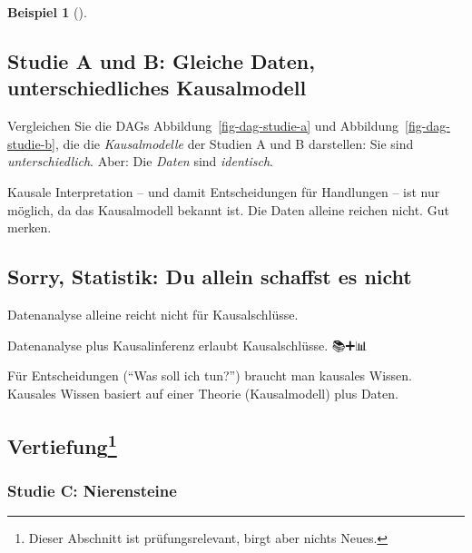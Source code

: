 \documentclass[
  ngerman,
  letterpaper,
  twoside,
  open=any]{scrbook}
\theoremstyle{definition}
\newtheorem{example}{Beispiel}[chapter]
\theoremstyle{plain}
\theoremstyle{definition}
\theoremstyle{definition}
\theoremstyle{remark}
\begin{document}
\begin{example}[]
\subsection{Studie A und B: Gleiche Daten, unterschiedliches
Kausalmodell}\label{studie-a-und-b-gleiche-daten-unterschiedliches-kausalmodell-1}

Vergleichen Sie die DAGs Abbildung~\ref{fig-dag-studie-a} und
Abbildung~\ref{fig-dag-studie-b}, die die \emph{Kausalmodelle} der
Studien A und B darstellen: Sie sind \emph{unterschiedlich}. Aber: Die
\emph{Daten} sind \emph{identisch}.

Kausale Interpretation -- und damit Entscheidungen für Handlungen -- ist
nur möglich, da das Kausalmodell bekannt ist. Die Daten alleine reichen
nicht. Gut merken.

\subsection{Sorry, Statistik: Du allein schaffst es
nicht}\label{sorry-statistik-du-allein-schaffst-es-nicht-1}

Datenanalyse alleine reicht nicht für Kausalschlüsse. 🧟

Datenanalyse plus Kausalinferenz erlaubt Kausalschlüsse. 📚➕📊 🟰 🤩

\begin{tcolorbox}[enhanced jigsaw, arc=.35mm, bottomrule=.15mm, bottomtitle=1mm, breakable, colback=white, colbacktitle=quarto-callout-important-color!10!white, colframe=quarto-callout-important-color-frame, coltitle=black, left=2mm, leftrule=.75mm, opacityback=0, opacitybacktitle=0.6, rightrule=.15mm, title=\textcolor{quarto-callout-important-color}{\faExclamation}\hspace{0.5em}{Wichtig}, titlerule=0mm, toprule=.15mm, toptitle=1mm]

Für Entscheidungen (\enquote{Was soll ich tun?}) braucht man kausales
Wissen. Kausales Wissen basiert auf einer Theorie (Kausalmodell) plus
Daten.

\end{tcolorbox}

\subsection[Vertiefung]{\texorpdfstring{Vertiefung\footnote{Dieser
  Abschnitt ist prüfungsrelevant, birgt aber nichts Neues.}}{Vertiefung}}\label{vertiefung-5}

\subsubsection{Studie C: Nierensteine}\label{studie-c-nierensteine}


\end{example}
\end{document}
